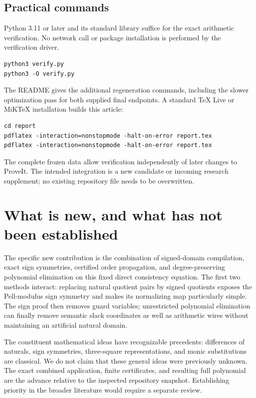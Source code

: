 \documentclass[11pt,letterpaper]{article}
\theoremstyle{definition}
\begin{document}
\subsection{Practical commands}

Python 3.11 or later and its standard library suffice for the exact
arithmetic verification. No network call or package installation is
performed by the verification driver.
\begin{lstlisting}
python3 verify.py
python3 -O verify.py
\end{lstlisting}
The README gives the additional regeneration commands, including the
slower optimization pass for both supplied final endpoints. A
standard TeX Live or MiKTeX installation builds this article:
\begin{lstlisting}
cd report
pdflatex -interaction=nonstopmode -halt-on-error report.tex
pdflatex -interaction=nonstopmode -halt-on-error report.tex
\end{lstlisting}
The complete frozen data allow verification independently of later
changes to ProveIt. The intended integration is a new candidate or
incoming research supplement; no existing repository file needs to be
overwritten.

\section{What is new, and what has not been established}

The specific new contribution is the combination of signed-domain
compilation, exact sign symmetries, certified order propagation, and
degree-preserving polynomial elimination on this fixed direct
consistency equation. The first two methods interact: replacing
natural quotient pairs by signed quotients exposes the Pell-modulus
sign symmetry and makes its normalizing map particularly simple.
The sign proof then removes guard variables; unrestricted polynomial
elimination can finally remove semantic slack coordinates as well as
arithmetic wires without maintaining an artificial natural domain.

The constituent mathematical ideas have recognizable precedents:
differences of naturals, sign symmetries, three-square representations,
and monic substitutions are classical. We do not claim that these
general ideas were previously unknown. The exact combined application,
finite certificates, and resulting full polynomial are the advance
relative to the inspected repository snapshot. Establishing priority
in the broader literature would require a separate review.
\end{document}
